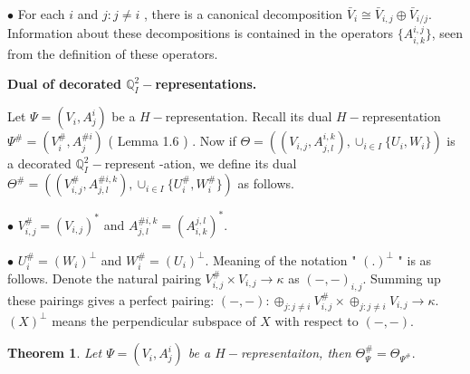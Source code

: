 \def\CTEXPreproc{Created by ctex v0.2.12, don't edit!}\documentclass[11pt]{article}
\newtheorem{thm}{Theorem}[section]
\begin{document}
\noindent$\bullet $ For each $i$ and $j: j\neq i$ , there is a canonical decomposition $\bar{V}_i \cong \bar{V}_{i,j} \oplus \bar{V}_{i/j}$. Information about these decompositions is contained in the operators $\{ A^{i,j} _{i,k} \}$, seen from the definition of these operators.

  \noindent \textbf{Dual of decorated $\mathbb{Q}^2 _{I}-$representations. }

  Let $\Psi = ( V_i , A^i _j  )$ be a $H-$representation. Recall its dual
 $H-$representation $\Psi^{\#}= ( V^{\#}_i , A^{\# i}_j   )$ ( Lemma 1.6 ) .  Now if $\Theta=
 ( (V_{i,j} , A^{i,k}_{j,l}), \cup_{i\in I} \{ U_i ,W_i \}  )  $ is a decorated $\mathbb{Q}^2 _{I}-$represent
 -ation, we define its dual
 $\Theta^{\#}=( (V^{\#}_{i,j} , A^{\# i,k}_{j,l}), \cup_{i\in I} \{ U^{\#} _i ,W^{\#} _i \}  ) $ as follows.

 \noindent $\bullet$ $V^{\#}_{i,j} = ( V_{i,j} )^{*}$ and $ A^{\# i,k} _{j,l} = ( A^{j,l}_{i,k} )^{*}   $.

 \noindent $\bullet$ $ U^{\#}_i = ( W_i )^{\perp}  $ and $W^{\#}_i = (U_i )^{\perp}  $.  Meaning of the notation " $ (.)^{\perp}  $  " is as follows. Denote the natural pairing $ V^{\#} _{i,j} \times V_{i,j}\rightarrow \kappa  $ as $( -,- )_{i,j}$. Summing up these pairings gives a perfect pairing: $(-,-): \oplus_{j:j\neq i } V^{\#}_{i,j} \times \oplus_{j: j\neq i } V_{i,j} \rightarrow \kappa$. $(X)^{\perp}$ means the perpendicular subspace of $X$ with respect to $(-,-)$.


  \begin{thm} Let $\Psi = (V_i , A^i _j )$ be a $H-$representaiton, then $\Theta^{\#} _{\Psi} = \Theta_{ \Psi^{\#} } .   $

  \end{thm}
\end{document}
